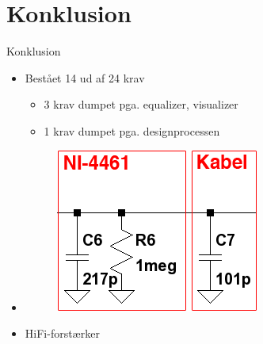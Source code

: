 \section{Konklusion}
\begin{frame}{Konklusion}

\begin{itemize}
\item<1-> Bestået 14 ud af 24 krav
\begin{itemize}
\item<1-> 3 krav dumpet pga. equalizer, visualizer
\item<1-> 1 krav dumpet pga. designprocessen
\end{itemize}
\item<2-> \begin{figure}[h]
\includegraphics[scale=0.6]{images/maalebelastning.png}
\end{figure}
\item<3-> \textcolor{light-gray}{HiFi-}forstærker
\end{itemize}

\end{frame}
